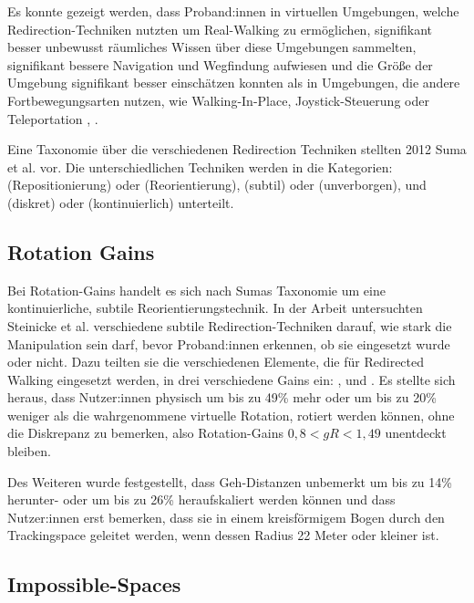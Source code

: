Es konnte gezeigt werden, dass Proband:innen in virtuellen Umgebungen, welche Redirection-Techniken nutzten um Real-Walking zu ermöglichen, signifikant besser unbewusst räumliches Wissen über diese Umgebungen sammelten, signifikant bessere Navigation und Wegfindung aufwiesen und die Größe der Umgebung signifikant besser einschätzen konnten als in Umgebungen, die andere Fortbewegungsarten nutzen, wie Walking-In-Place, Joystick-Steuerung oder Teleportation \cite{peck-vergleich-2011}, \cite{langbehn-vergleich-2018}.

Eine Taxonomie über die verschiedenen Redirection Techniken stellten 2012 Suma et al. \cite{taxonomy} vor. Die unterschiedlichen Techniken werden in die Kategorien:  (Repositionierung) oder  (Reorientierung),  (subtil) oder  (unverborgen), und  (diskret) oder  (kontinuierlich) unterteilt.


\subsection{Rotation Gains}

Bei Rotation-Gains handelt es sich nach Sumas Taxonomie \cite{taxonomy} um eine kontinuierliche, subtile Reorientierungstechnik. In der Arbeit \cite{detection-thresholds} untersuchten Steinicke et al. verschiedene subtile Redirection-Techniken darauf, wie stark die Manipulation sein darf, bevor Proband:innen erkennen, ob sie eingesetzt wurde oder nicht. Dazu teilten sie die verschiedenen Elemente, die für Redirected Walking eingesetzt werden, in drei verschiedene Gains ein: ,  und . Es stellte sich heraus, dass Nutzer:innen physisch um bis zu 49\% mehr oder um bis zu 20\% weniger als die wahrgenommene virtuelle Rotation, rotiert werden können, ohne die Diskrepanz zu bemerken, also Rotation-Gains $0,8 < gR < 1,49$ unentdeckt bleiben.

Des Weiteren wurde festgestellt, dass Geh-Distanzen unbemerkt um bis zu 14\% herunter- oder um bis zu 26\% heraufskaliert werden können und dass Nutzer:innen erst bemerken, dass sie in einem kreisförmigem Bogen durch den Trackingspace geleitet werden, wenn dessen Radius 22 Meter oder kleiner ist.

\subsection{Impossible-Spaces}

